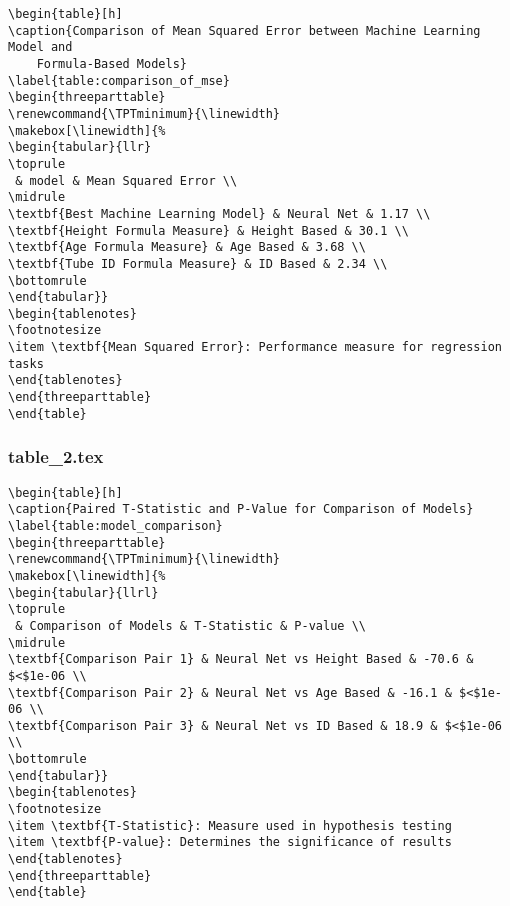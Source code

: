 \documentclass[11pt]{article}
\begin{document}
\begin{Verbatim}[tabsize=4]
\begin{table}[h]
\caption{Comparison of Mean Squared Error between Machine Learning Model and
	Formula-Based Models}
\label{table:comparison_of_mse}
\begin{threeparttable}
\renewcommand{\TPTminimum}{\linewidth}
\makebox[\linewidth]{%
\begin{tabular}{llr}
\toprule
 & model & Mean Squared Error \\
\midrule
\textbf{Best Machine Learning Model} & Neural Net & 1.17 \\
\textbf{Height Formula Measure} & Height Based & 30.1 \\
\textbf{Age Formula Measure} & Age Based & 3.68 \\
\textbf{Tube ID Formula Measure} & ID Based & 2.34 \\
\bottomrule
\end{tabular}}
\begin{tablenotes}
\footnotesize
\item \textbf{Mean Squared Error}: Performance measure for regression tasks
\end{tablenotes}
\end{threeparttable}
\end{table}

\end{Verbatim}

\subsubsection*{table\_2.tex}

\begin{Verbatim}[tabsize=4]
\begin{table}[h]
\caption{Paired T-Statistic and P-Value for Comparison of Models}
\label{table:model_comparison}
\begin{threeparttable}
\renewcommand{\TPTminimum}{\linewidth}
\makebox[\linewidth]{%
\begin{tabular}{llrl}
\toprule
 & Comparison of Models & T-Statistic & P-value \\
\midrule
\textbf{Comparison Pair 1} & Neural Net vs Height Based & -70.6 & $<$1e-06 \\
\textbf{Comparison Pair 2} & Neural Net vs Age Based & -16.1 & $<$1e-06 \\
\textbf{Comparison Pair 3} & Neural Net vs ID Based & 18.9 & $<$1e-06 \\
\bottomrule
\end{tabular}}
\begin{tablenotes}
\footnotesize
\item \textbf{T-Statistic}: Measure used in hypothesis testing
\item \textbf{P-value}: Determines the significance of results
\end{tablenotes}
\end{threeparttable}
\end{table}

\end{Verbatim}
\end{document}
